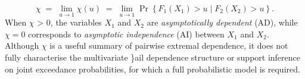 \documentclass[12pt,compact]{article}
\begin{document}
\begin{equation} \label{eq:chi}
  \chi \;=\; \lim_{u\to 1} \chi(u) \;=\; \lim_{u\to 1}\Pr\left\{F_1(X_1)>u \mid F_2(X_2)>u\right\}.
\end{equation}
When $\chi$ > 0, the variables $X_1$ and $X_2$ are \emph{asymptotically dependent} (AD), while $\chi=0$ corresponds to \emph{asymptotic independence} (AI) between $X_1$ and $X_2$.
Although \(\chi\) is a useful summary of pairwise extremal dependence, it does not fully characterise the multivariate \}ail dependence structure or support inference on joint exceedance probabilities, for which a full probabilistic model is required.
\end{document}
